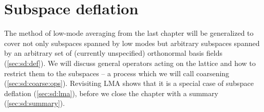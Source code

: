 \chapter{Subspace deflation}
\label{ch:p2:subspace-deflation}



The method of low-mode averaging from the last chapter will be generalized to cover not only subspaces spanned by low modes but arbitrary subspaces spanned by an arbitrary set of (currently unspecified) orthonormal basis fields (\cref{sec:sd:def}).
We will discuss general operators acting on the lattice and how to restrict them to the subspaces -- a process which we will call coarsening (\cref{sec:sd:coarse:ops}).
Revisiting LMA shows that it is a special case of subspace deflation (\cref{sec:sd:lma}), before we close the chapter with a summary (\cref{sec:sd:summary}).




